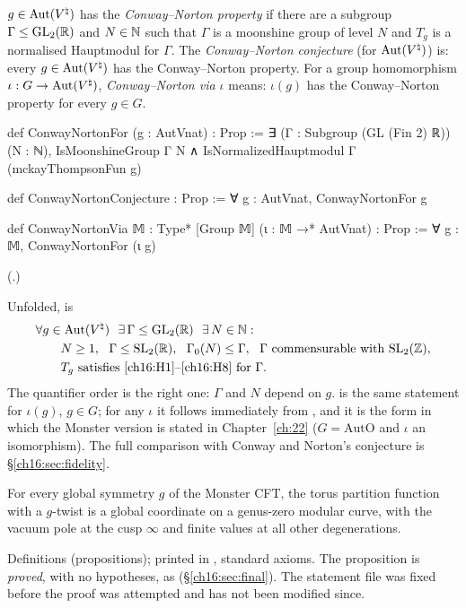 \begin{definition}\label{ch16:def:cn}
$g\in\operatorname{Aut}({V^{\natural}})$ has the \emph{Conway--Norton property} if there are a subgroup $\Gamma\le\mathrm{GL}_2(\mathbb{R})$ and
$N\in{\mathbb{N}}$ such that $\Gamma$ is a moonshine group of level $N$ and $T_g$ is a normalised Hauptmodul for $\Gamma$.  The
\emph{Conway--Norton conjecture} (for $\operatorname{Aut}({V^{\natural}})$) is: every $g\in\operatorname{Aut}({V^{\natural}})$ has the Conway--Norton property.  For a
group homomorphism $\iota:G\to\operatorname{Aut}({V^{\natural}})$, \emph{Conway--Norton via $\iota$} means: $\iota(g)$ has the Conway--Norton
property for every $g\in G$.
\end{definition}
\begin{leancode}
def ConwayNortonFor (g : AutVnat) : Prop :=
  ∃ (Γ : Subgroup (GL (Fin 2) ℝ)) (N : ℕ), IsMoonshineGroup Γ N ∧
    IsNormalizedHauptmodul Γ (mckayThompsonFun g)

def ConwayNortonConjecture : Prop :=
  ∀ g : AutVnat, ConwayNortonFor g

def ConwayNortonVia {𝕄 : Type*} [Group 𝕄] (ι : 𝕄 →* AutVnat) : Prop :=
  ∀ g : 𝕄, ConwayNortonFor (ι g)
\end{leancode}
(.)
\begin{dictionary}
Unfolded,  is
\begin{align*}
  &\forall g\in\Aut(\Vnat)\ \ \exists\,\Gamma\le\chsixteenGLR\ \ \exists\,N\in\N:\\
  &\qquad N\ge1,\ \ \Gamma\le\chsixteenSLR,\ \ \Gamma_0(N)\le\Gamma,\ \ \Gamma\ \text{commensurable with}\ \chsixteenSL,\\
  &\qquad T_g\ \text{satisfies \ref{ch16:H1}--\ref{ch16:H8} for }\Gamma .
\end{align*}
The quantifier order is the right one: $\Gamma$ and $N$ depend on $g$.   is the same statement
for $\iota(g)$, $g\in G$; for any $\iota$ it follows immediately from , and it is the form
in which the Monster version is stated in Chapter~\ref{ch:22} ($G=\mathrm{AutO}$ and $\iota$ an isomorphism).  The
full comparison with Conway and Norton's conjecture is \S\ref{ch16:sec:fidelity}.
\end{dictionary}
\begin{physics}
For every global symmetry $g$ of the Monster CFT, the torus partition function with a $g$-twist is a global
coordinate on a genus-zero modular curve, with the vacuum pole at the cusp $\infty$ and finite values at all
other degenerations.
\end{physics}
\begin{status}
Definitions (propositions); printed in , standard axioms.  The
proposition  is \emph{proved}, with no hypotheses, as 
(\S\ref{ch16:sec:final}).  The statement file was fixed before the proof was attempted and has not been modified since.
\end{status}

